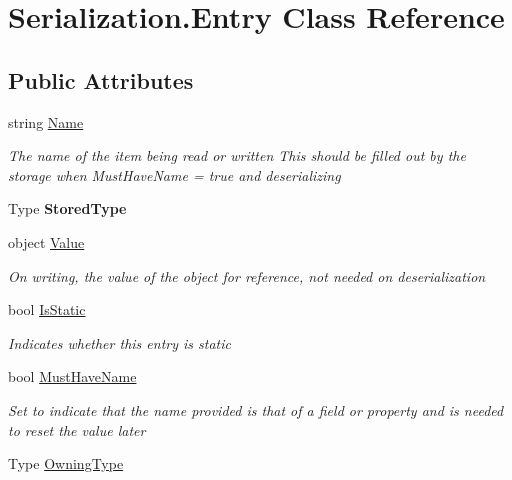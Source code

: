 \hypertarget{class_serialization_1_1_entry}{}\section{Serialization.\+Entry Class Reference}
\label{class_serialization_1_1_entry}
\subsection*{Public Attributes}
\begin{DoxyCompactItemize}
\item 
string \hyperlink{class_serialization_1_1_entry_a27386eb83718b39bfc36c67585639247}{Name}
\begin{DoxyCompactList}\small\item\em The name of the item being read or written This should be filled out by the storage when Must\+Have\+Name = true and deserializing \end{DoxyCompactList}\item 
\mbox{\label{class_serialization_1_1_entry_a4654173d7df1c387d25517dcf2393a4f}} 
Type {\bfseries Stored\+Type}
\item 
object \hyperlink{class_serialization_1_1_entry_a17a664469636a801c96b7224972cf928}{Value}
\begin{DoxyCompactList}\small\item\em On writing, the value of the object for reference, not needed on deserialization \end{DoxyCompactList}\item 
bool \hyperlink{class_serialization_1_1_entry_aa2f98ee039ca25cefe57774a76903556}{Is\+Static}
\begin{DoxyCompactList}\small\item\em Indicates whether this entry is static \end{DoxyCompactList}\item 
bool \hyperlink{class_serialization_1_1_entry_a09a13ff1f6b299c4728a734b307de2b5}{Must\+Have\+Name}
\begin{DoxyCompactList}\small\item\em Set to indicate that the name provided is that of a field or property and is needed to reset the value later \end{DoxyCompactList}\item 
Type \hyperlink{class_serialization_1_1_entry_a1fd7fb4ac04afda6919998688f741e33}{Owning\+Type}

\end{DoxyCompactItemize}
